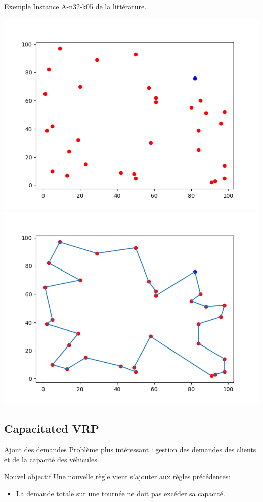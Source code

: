 \documentclass{beamer}
\begin{document}
\begin{frame}{Exemple} 
Instance A-n32-k05 de la littérature.
\begin{center}
\includegraphics[scale=0.3]{Instance.png}
\includegraphics[scale=0.3]{solutionNoCapacity.png}
\end{center}
\end{frame}

\subsection{Capacitated VRP}

\begin{frame}{Ajout des demandes}
Problème plus intéressant : gestion des demandes des clients et de la capacité des véhicules.
\begin{block}{Nouvel objectif}
Une nouvelle règle vient s'ajouter aux règles précédentes:
\begin{itemize}
\item La demande totale sur une tournée ne doit pas excéder sa capacité.
\end{itemize}
\end{block}
\end{frame}
\end{document}
